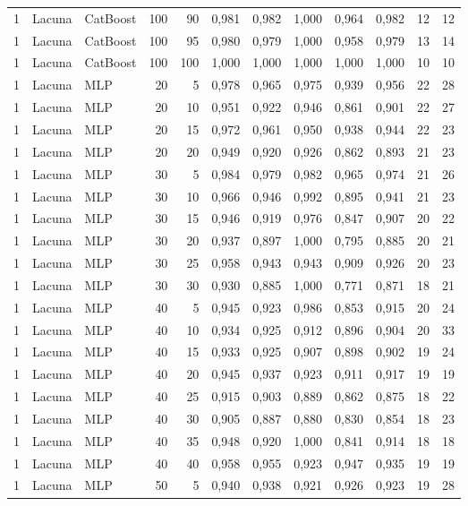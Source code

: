 \begin{longtable}{@{}rllrrrrrrrrr@{}}
1 & Lacuna & CatBoost & 100 & 90 & 0,981 & 0,982 & 1,000 & 0,964 & 0,982 & 12 & 12 \\
1 & Lacuna & CatBoost & 100 & 95 & 0,980 & 0,979 & 1,000 & 0,958 & 0,979 & 13 & 14 \\
1 & Lacuna & CatBoost & 100 & 100 & 1,000 & 1,000 & 1,000 & 1,000 & 1,000 & 10 & 10 \\
1 & Lacuna & MLP & 20 & 5 & 0,978 & 0,965 & 0,975 & 0,939 & 0,956 & 22 & 28 \\
1 & Lacuna & MLP & 20 & 10 & 0,951 & 0,922 & 0,946 & 0,861 & 0,901 & 22 & 27 \\
1 & Lacuna & MLP & 20 & 15 & 0,972 & 0,961 & 0,950 & 0,938 & 0,944 & 22 & 23 \\
1 & Lacuna & MLP & 20 & 20 & 0,949 & 0,920 & 0,926 & 0,862 & 0,893 & 21 & 23 \\
1 & Lacuna & MLP & 30 & 5 & 0,984 & 0,979 & 0,982 & 0,965 & 0,974 & 21 & 26 \\
1 & Lacuna & MLP & 30 & 10 & 0,966 & 0,946 & 0,992 & 0,895 & 0,941 & 21 & 23 \\
1 & Lacuna & MLP & 30 & 15 & 0,946 & 0,919 & 0,976 & 0,847 & 0,907 & 20 & 22 \\
1 & Lacuna & MLP & 30 & 20 & 0,937 & 0,897 & 1,000 & 0,795 & 0,885 & 20 & 21 \\
1 & Lacuna & MLP & 30 & 25 & 0,958 & 0,943 & 0,943 & 0,909 & 0,926 & 20 & 23 \\
1 & Lacuna & MLP & 30 & 30 & 0,930 & 0,885 & 1,000 & 0,771 & 0,871 & 18 & 21 \\
1 & Lacuna & MLP & 40 & 5 & 0,945 & 0,923 & 0,986 & 0,853 & 0,915 & 20 & 24 \\
1 & Lacuna & MLP & 40 & 10 & 0,934 & 0,925 & 0,912 & 0,896 & 0,904 & 20 & 33 \\
1 & Lacuna & MLP & 40 & 15 & 0,933 & 0,925 & 0,907 & 0,898 & 0,902 & 19 & 24 \\
1 & Lacuna & MLP & 40 & 20 & 0,945 & 0,937 & 0,923 & 0,911 & 0,917 & 19 & 19 \\
1 & Lacuna & MLP & 40 & 25 & 0,915 & 0,903 & 0,889 & 0,862 & 0,875 & 18 & 22 \\
1 & Lacuna & MLP & 40 & 30 & 0,905 & 0,887 & 0,880 & 0,830 & 0,854 & 18 & 23 \\
1 & Lacuna & MLP & 40 & 35 & 0,948 & 0,920 & 1,000 & 0,841 & 0,914 & 18 & 18 \\
1 & Lacuna & MLP & 40 & 40 & 0,958 & 0,955 & 0,923 & 0,947 & 0,935 & 19 & 19 \\
1 & Lacuna & MLP & 50 & 5 & 0,940 & 0,938 & 0,921 & 0,926 & 0,923 & 19 & 28 \\

\end{longtable}
